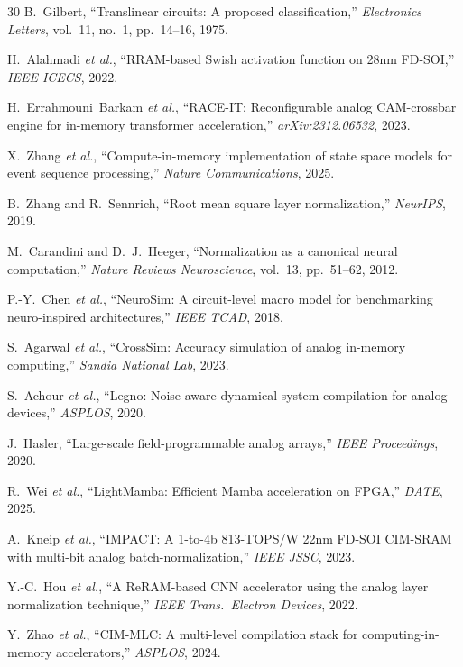 \documentclass[11pt]{article}
\begin{document}
\begin{thebibliography}{30}
 B.~Gilbert, ``Translinear circuits: A proposed classification,'' \textit{Electronics Letters}, vol.~11, no.~1, pp.~14--16, 1975.

 H.~Alahmadi \textit{et al.}, ``RRAM-based Swish activation function on 28nm FD-SOI,'' \textit{IEEE ICECS}, 2022.

 H.~Errahmouni~Barkam \textit{et al.}, ``RACE-IT: Reconfigurable analog CAM-crossbar engine for in-memory transformer acceleration,'' \textit{arXiv:2312.06532}, 2023.

 X.~Zhang \textit{et al.}, ``Compute-in-memory implementation of state space models for event sequence processing,'' \textit{Nature Communications}, 2025.

 B.~Zhang and R.~Sennrich, ``Root mean square layer normalization,'' \textit{NeurIPS}, 2019.

 M.~Carandini and D.~J.~Heeger, ``Normalization as a canonical neural computation,'' \textit{Nature Reviews Neuroscience}, vol.~13, pp.~51--62, 2012.

 P.-Y.~Chen \textit{et al.}, ``NeuroSim: A circuit-level macro model for benchmarking neuro-inspired architectures,'' \textit{IEEE TCAD}, 2018.

 S.~Agarwal \textit{et al.}, ``CrossSim: Accuracy simulation of analog in-memory computing,'' \textit{Sandia National Lab}, 2023.

 S.~Achour \textit{et al.}, ``Legno: Noise-aware dynamical system compilation for analog devices,'' \textit{ASPLOS}, 2020.

 J.~Hasler, ``Large-scale field-programmable analog arrays,'' \textit{IEEE Proceedings}, 2020.

 R.~Wei \textit{et al.}, ``LightMamba: Efficient Mamba acceleration on FPGA,'' \textit{DATE}, 2025.

 A.~Kneip \textit{et al.}, ``IMPACT: A 1-to-4b 813-TOPS/W 22nm FD-SOI CIM-SRAM with multi-bit analog batch-normalization,'' \textit{IEEE JSSC}, 2023.

 Y.-C.~Hou \textit{et al.}, ``A ReRAM-based CNN accelerator using the analog layer normalization technique,'' \textit{IEEE Trans.\ Electron Devices}, 2022.

 Y.~Zhao \textit{et al.}, ``CIM-MLC: A multi-level compilation stack for computing-in-memory accelerators,'' \textit{ASPLOS}, 2024.


\end{thebibliography}
\end{document}
